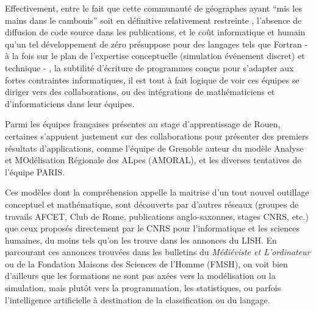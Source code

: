Effectivement, entre le fait que cette communauté de géographes ayant \enquote{mis les mains dans le cambouis} soit en définitive relativement restreinte , l'absence de diffusion de code source dans les publications, et le coût informatique et humain qu'un tel développement de zéro présuppose pour des langages tels que Fortran - à la fois sur le plan de l'expertise conceptuelle (simulation événement discret) et technique - , la subtilité d'écriture de programmes conçus pour s'adapter aux fortes contraintes informatiques, il est tout à fait logique de voir ces équipes se diriger vers des collaborations, ou des intégrations de mathématiciens et d'informaticiens dans leur équipes. %

Parmi les équipes françaises présentes au stage d'apprentissage de Rouen, certaines s'appuient justement sur des collaborations pour présenter des premiers résultats d'applications, comme l’équipe de Grenoble auteur du modèle Analyse et MOdélisation Régionale des ALpes (AMORAL), et les diverses tentatives de l’équipe PARIS.  %

Ces modèles dont la compréhension appelle la maitrise d'un tout nouvel outillage conceptuel et mathématique, sont découverts par d'autres réseaux (groupes de travails AFCET, Club de Rome, publications anglo-saxonnes, stages CNRS, etc.) que ceux proposés directement par le CNRS pour l'informatique et les sciences humaines, du moins tels qu'on les trouve dans les annonces du LISH. En parcourant ces annonces trouvées dans les bulletins du \textit{Médiéviste et L'ordinateur} ou de la Fondation Maisons des Sciences de l'Homme (FMSH), on voit bien d'ailleurs que les formations ne sont pas axées vers la modélisation ou la simulation, mais plutôt vers la programmation, les statistiques, ou parfois l'intelligence artificielle à destination de la classification ou du langage.

